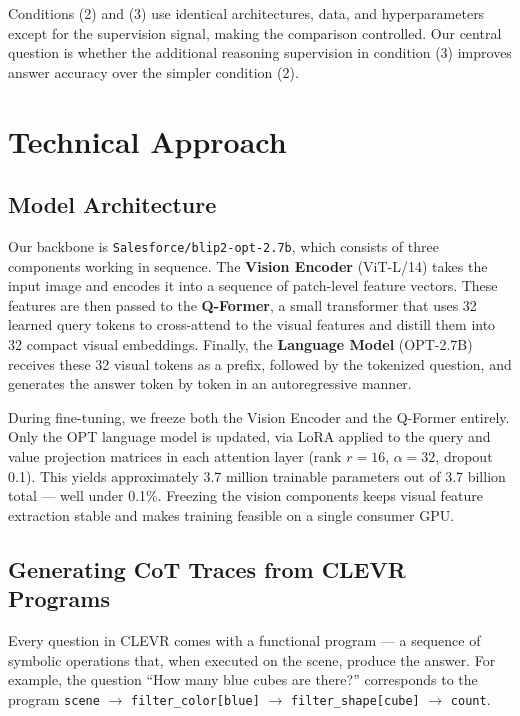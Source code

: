 \documentclass[11pt,twocolumn]{article}
\begin{document}
Conditions (2) and (3) use identical architectures, data, and hyperparameters except for the supervision signal, making the comparison controlled. Our central question is whether the additional reasoning supervision in condition (3) improves answer accuracy over the simpler condition (2).

\section{Technical Approach}

\subsection{Model Architecture}

Our backbone is \texttt{Salesforce/blip2-opt-2.7b}, which consists of three components working in sequence. The \textbf{Vision Encoder} (ViT-L/14) takes the input image and encodes it into a sequence of patch-level feature vectors. These features are then passed to the \textbf{Q-Former}, a small transformer that uses 32 learned query tokens to cross-attend to the visual features and distill them into 32 compact visual embeddings. Finally, the \textbf{Language Model} (OPT-2.7B) receives these 32 visual tokens as a prefix, followed by the tokenized question, and generates the answer token by token in an autoregressive manner.

During fine-tuning, we freeze both the Vision Encoder and the Q-Former entirely. Only the OPT language model is updated, via LoRA applied to the query and value projection matrices in each attention layer (rank $r=16$, $\alpha=32$, dropout 0.1). This yields approximately 3.7 million trainable parameters out of 3.7 billion total — well under 0.1\%. Freezing the vision components keeps visual feature extraction stable and makes training feasible on a single consumer GPU.

\subsection{Generating CoT Traces from CLEVR Programs}

Every question in CLEVR comes with a functional program — a sequence of symbolic operations that, when executed on the scene, produce the answer. For example, the question ``How many blue cubes are there?'' corresponds to the program \texttt{scene} $\to$ \texttt{filter\_color[blue]} $\to$ \texttt{filter\_shape[cube]} $\to$ \texttt{count}.
\end{document}
